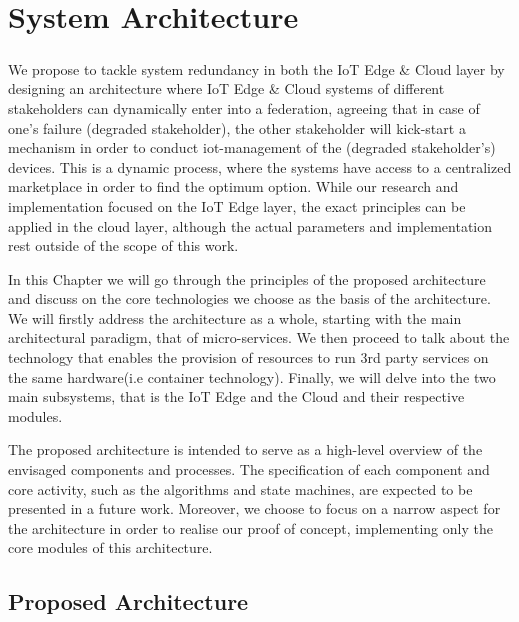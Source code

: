 \chapter{System Architecture} \label{ch:system-architecture}

\paragraph{}
We propose to tackle system redundancy in both the IoT Edge \& Cloud layer by designing an architecture where IoT Edge \& Cloud systems of different stakeholders can dynamically enter into a federation, agreeing that in case of one’s failure (degraded \gls{stakeholder}), the other stakeholder will kick-start a mechanism in order to conduct \gls{iot-management} of the (degraded stakeholder’s) devices. This is a dynamic process, where the systems have access to a centralized marketplace in order to find the optimum option. While our research and implementation focused on the IoT Edge layer, the exact principles can be applied in the cloud layer, although the actual parameters and implementation rest outside of the scope of this work.

In this Chapter we will go through the principles of the proposed architecture and discuss on the core technologies  we choose as the basis of the architecture. We will firstly address the architecture as a whole, starting with the main architectural paradigm, that of micro-services. We then proceed to talk about the technology that enables the provision of resources to run 3rd party services on the same hardware(i.e container technology). Finally, we will delve into the two main subsystems, that is the IoT Edge and the Cloud and their respective modules.

The proposed architecture is intended to serve as a high-level overview of the envisaged components and processes. The specification of each component and core activity, such as the algorithms and state machines, are expected to be presented in a future work. Moreover, we choose to focus on a narrow aspect for the architecture in order to realise our proof of concept, implementing only the core modules of this architecture.

\section{Proposed Architecture}


